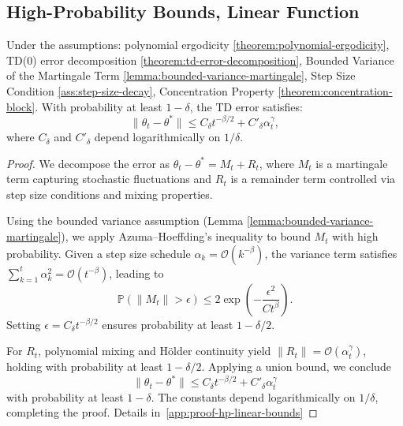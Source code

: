 \subsection{High-Probability Bounds, Linear Function}

\begin{theorem}
\label{theorem:hp-linear-bounds}
Under the assumptions: polynomial ergodicity \ref{theorem:polynomial-ergodicity}, TD(0) error decomposition \ref{theorem:td-error-decomposition}, Bounded Variance of the Martingale Term \ref{lemma:bounded-variance-martingale}, Step Size Condition \ref{ass:step-size-decay}, Concentration Property \ref{theorem:concentration-block}. With probability at least \(1 - \delta\), the TD error satisfies:
\[
\|\theta_t - \theta^*\| \leq C_\delta t^{-\beta/2} + C'_\delta \alpha_t^\gamma,
\]
where \(C_\delta\) and \(C'_\delta\) depend logarithmically on \(1/\delta\).
\end{theorem}

\begin{proof}
We decompose the error as \(\theta_t - \theta^* = M_t + R_t\), where \(M_t\) is a martingale term capturing stochastic fluctuations and \(R_t\) is a remainder term controlled via step size conditions and mixing properties.  

Using the bounded variance assumption (Lemma \ref{lemma:bounded-variance-martingale}), we apply Azuma–Hoeffding’s inequality to bound \(M_t\) with high probability. Given a step size schedule \(\alpha_k = \mathcal{O}(k^{-\beta})\), the variance term satisfies \(\sum_{k=1}^t \alpha_k^2 = \mathcal{O}(t^{-\beta})\), leading to  
\[
\mathbb{P}(\|M_t\| > \epsilon) \leq 2 \exp\left(-\frac{\epsilon^2}{C t^{\beta}}\right).
\]
Setting \(\epsilon = C_\delta t^{-\beta/2}\) ensures probability at least \(1 - \delta/2\).  

For \(R_t\), polynomial mixing and Hölder continuity yield \(\|R_t\| = \mathcal{O}(\alpha_t^\gamma)\), holding with probability at least \(1 - \delta/2\). Applying a union bound, we conclude  
\[
\|\theta_t - \theta^*\| \leq C_\delta t^{-\beta/2} + C'_\delta \alpha_t^\gamma
\]
with probability at least \(1 - \delta\). The constants depend logarithmically on \(1/\delta\), completing the proof.  
Details in~\ref{app:proof-hp-linear-bounds}
\end{proof}